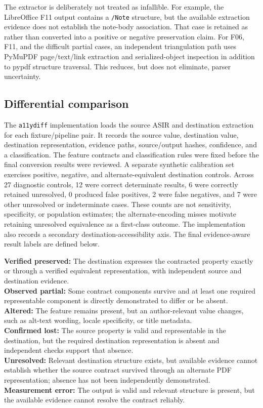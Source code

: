 The extractor is deliberately not treated as infallible. For example, the LibreOffice F11 output contains a \texttt{/Note} structure, but the available extraction evidence does not establish the note-body association. That case is retained as \measured{} rather than converted into a positive or negative preservation claim. For F06, F11, and the difficult partial cases, an independent triangulation path uses PyMuPDF page/text/link extraction and serialized-object inspection in addition to pypdf structure traversal. This reduces, but does not eliminate, parser uncertainty.

\subsection{Differential comparison}

The \texttt{a11ydiff} implementation loads the source ASIR and destination extraction for each fixture/pipeline pair. It records the source value, destination value, destination representation, evidence paths, source/output hashes, confidence, and a classification. The feature contracts and classification rules were fixed before the final conversion results were reviewed. A separate synthetic calibration set exercises positive, negative, and alternate-equivalent destination controls. Across 27 diagnostic controls, 12 were correct determinate results, 6 were correctly retained unresolved, 0 produced false positives, 2 were false negatives, and 7 were other unresolved or indeterminate cases. These counts are not sensitivity, specificity, or population estimates; the alternate-encoding misses motivate retaining unresolved equivalence as a first-class outcome. The implementation also records a secondary destination-accessibility axis. The final evidence-aware result labels are defined below.

\noindent\textbf{Verified preserved:} The destination expresses the contracted property exactly or through a verified equivalent representation, with independent source and destination evidence.\\
\textbf{Observed partial:} Some contract components survive and at least one required representable component is directly demonstrated to differ or be absent.\\
\textbf{Altered:} The feature remains present, but an author-relevant value changes, such as alt-text wording, locale specificity, or title metadata.\\
\textbf{Confirmed lost:} The source property is valid and representable in the destination, but the required destination representation is absent and independent checks support that absence.\\
\textbf{Unresolved:} Relevant destination structure exists, but available evidence cannot establish whether the source contract survived through an alternate PDF representation; absence has not been independently demonstrated.\\
\textbf{Measurement error:} The output is valid and relevant structure is present, but the available evidence cannot resolve the contract reliably.

